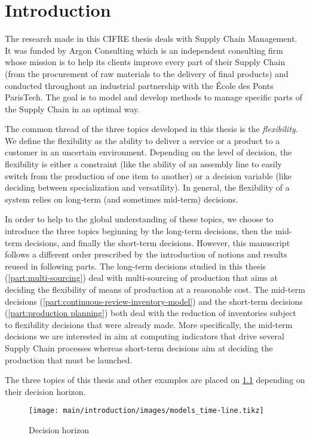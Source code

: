\chapter{Introduction}
\label{chap:intro:en}


The research made in this CIFRE thesis deals with Supply Chain Management.
It was funded by Argon Consulting which is an independent consulting firm whose mission is to help its clients improve every part of their Supply Chain (from the procurement of raw materials to the delivery of final products) and conducted throughout an industrial partnership with the \'Ecole des Ponts ParisTech.
The goal is to model and develop methods to manage specific parts of the Supply Chain in an optimal way.


The common thread of the three topics developed in this thesis is the \emph{flexibility}.
We define the flexibility as the ability to deliver a service or a product to a customer in an uncertain environment.
Depending on the level of decision, the flexibility is either a constraint (like the ability of an assembly line to easily switch from the production of one item to another) or a decision variable (like deciding between specialization and versatility).
In general, the flexibility of a system relies on long-term (and sometimes mid-term) decisions.


In order to help to the global understanding of these topics, we choose to introduce the three topics beginning by the long-term decisions, then the mid-term decisions, and finally the short-term decisions.
However, this manuscript follows a different order prescribed by the introduction of notions and results reused in following parts.
The long-term decisions studied in this thesis (\cref{part:multi-sourcing}) deal with multi-sourcing of production that aims at deciding the flexibility of means of production at a reasonable cost.
The mid-term decisions (\cref{part:continuous-review-inventory-model}) and the short-term decisions (\cref{part:production planning}) both deal with the reduction of inventories subject to flexibility decisions that were already made.
More specifically, the mid-term decisions we are interested in aim at computing indicators that drive several Supply Chain processes whereas short-term decisions aim at deciding the production that must be launched.


The three topics of this thesis and other examples are placed on \cref{fig:intro:en:models_time-line} depending on their decision horizon.
\begin{figure}[!ht]
  \centering
  \texttt{[image: main/introduction/images/models\_time-line.tikz]}
  \caption{Decision horizon}
  \label{fig:intro:en:models_time-line}
\end{figure}


